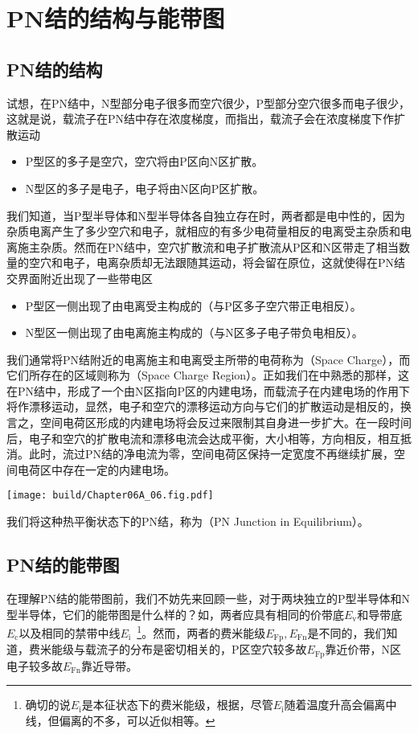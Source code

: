 \section{PN结的结构与能带图}

\subsection{PN结的结构}
试想，在PN结中，N型部分电子很多而空穴很少，P型部分空穴很多而电子很少，这就是说，载流子在PN结中存在浓度梯度，而指出，载流子会在浓度梯度下作扩散运动
\begin{itemize}
    \item P型区的多子是空穴，空穴将由P区向N区扩散。
    \item N型区的多子是电子，电子将由N区向P区扩散。
\end{itemize}
我们知道，当P型半导体和N型半导体各自独立存在时，两者都是电中性的，因为杂质电离产生了多少空穴和电子，就相应的有多少电荷量相反的电离受主杂质和电离施主杂质。然而在PN结中，空穴扩散流和电子扩散流从P区和N区带走了相当数量的空穴和电子，电离杂质却无法跟随其运动，将会留在原位，这就使得在PN结交界面附近出现了一些带电区
\begin{itemize}
    \item P型区一侧出现了由电离受主构成的（与P区多子空穴带正电相反）。
    \item N型区一侧出现了由电离施主构成的（与N区多子电子带负电相反）。
\end{itemize}
我们通常将PN结附近的电离施主和电离受主所带的电荷称为（Space Charge），而它们所存在的区域则称为（Space Charge Region）。正如我们在中熟悉的那样，这在PN结中，形成了一个由N区指向P区的内建电场，而载流子在内建电场的作用下将作漂移运动，显然，电子和空穴的漂移运动方向与它们的扩散运动是相反的，换言之，空间电荷区形成的内建电场将会反过来限制其自身进一步扩大。在一段时间后，电子和空穴的扩散电流和漂移电流会达成平衡，大小相等，方向相反，相互抵消。此时，流过PN结的净电流为零，空间电荷区保持一定宽度不再继续扩展，空间电荷区中存在一定的内建电场。

\begin{Figure}[PN结的空间电荷区]
    \texttt{[image: build/Chapter06A\_06.fig.pdf]}
\end{Figure}

我们将这种热平衡状态下的PN结，称为（PN Junction in Equilibrium）。


\subsection{PN结的能带图}
在理解PN结的能带图前，我们不妨先来回顾一些，对于两块独立的P型半导体和N型半导体，它们的能带图是什么样的？如，两者应具有相同的价带底$E_\text{v}$和导带底$E_\text{c}$以及相同的禁带中线$E_\text{i}$\ \footnote{确切的说$E_\text{i}$是本征状态下的费米能级，根据，尽管$E_\text{i}$随着温度升高会偏离中线，但偏离的不多，可以近似相等。}。然而，两者的费米能级$E_\text{Fp},E_\text{Fn}$是不同的，我们知道，费米能级与载流子的分布是密切相关的，P区空穴较多故$E_\text{Fp}$靠近价带，N区电子较多故$E_\text{Fn}$靠近导带。

